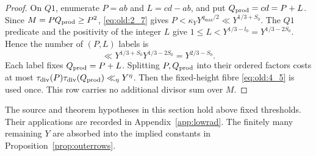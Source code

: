 \begin{proof}
On \(Q1\), enumerate \(P=ab\) and \(L=cd-ab\), and put
\(Q_{\rm prod}=cd=P+L\). Since \(M=PQ_{\rm prod}\ge P^2\),
\eqref{eq:old:2_7} gives \(P<\kappa_YY^{q_{\max}/2}\ll Y^{1/3+S_0}\).
The \(Q1\) predicate and the positivity of the integer \(L\) give
\(1\le L<Y^{1/3-l_0}=Y^{1/3-2S_0}\). Hence the number of \((P,L)\)
labels is
\[
\ll Y^{1/3+S_0}Y^{1/3-2S_0}=Y^{2/3-S_0}.
\]
Each label fixes \(Q_{\rm prod}=P+L\). Splitting \(P,Q_{\rm prod}\)
into their ordered factors costs at most
\(\tau_{\mathrm{div}}(P)\tau_{\mathrm{div}}(Q_{\rm prod})\ll_\eta Y^\eta\). Then the fixed-height fibre
\eqref{eq:old:4_5} is used once. This row carries no additional divisor sum
over \(M\).
\end{proof}

\begin{remark}
The source and theorem hypotheses in this section hold above fixed
thresholds. Their applications are recorded in
Appendix~\ref{app:lowrad}.
The finitely many remaining \(Y\) are absorbed into the implied constants
in Proposition~\ref{prop:outerrows}.
\end{remark}
